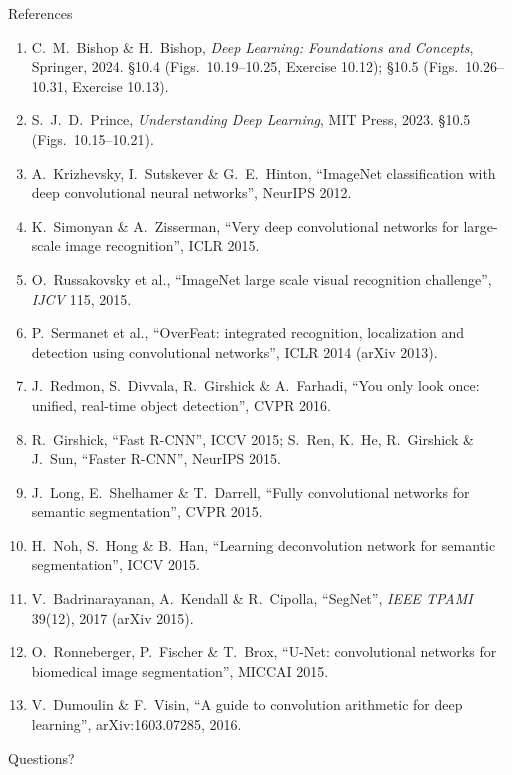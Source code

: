 \documentclass[aspectratio=169, 11pt]{beamer}
\begin{document}
\begin{frame}[allowframebreaks]{References}
  \vspace{0.3em}
  {\scriptsize
  \begin{enumerate}\itemsep0.30em
    \item C.\ M.\ Bishop \& H.\ Bishop, \emph{Deep Learning: Foundations
          and Concepts}, Springer, 2024. \S10.4 (Figs.~10.19--10.25,
          Exercise 10.12); \S10.5 (Figs.~10.26--10.31, Exercise 10.13).
    \item S.\ J.\ D.\ Prince, \emph{Understanding Deep Learning}, MIT
          Press, 2023. \S10.5 (Figs.~10.15--10.21).
    \item A.\ Krizhevsky, I.\ Sutskever \& G.\ E.\ Hinton, ``ImageNet
          classification with deep convolutional neural networks'',
          NeurIPS 2012.
    \item K.\ Simonyan \& A.\ Zisserman, ``Very deep convolutional
          networks for large-scale image recognition'', ICLR 2015.
    \item O.\ Russakovsky et al., ``ImageNet large scale visual
          recognition challenge'', \emph{IJCV} 115, 2015.
    \item P.\ Sermanet et al., ``OverFeat: integrated recognition,
          localization and detection using convolutional networks'',
          ICLR 2014 (arXiv 2013).
    \item J.\ Redmon, S.\ Divvala, R.\ Girshick \& A.\ Farhadi, ``You
          only look once: unified, real-time object detection'',
          CVPR 2016.
    \item R.\ Girshick, ``Fast R-CNN'', ICCV 2015; S.\ Ren, K.\ He,
          R.\ Girshick \& J.\ Sun, ``Faster R-CNN'', NeurIPS 2015.
    \item J.\ Long, E.\ Shelhamer \& T.\ Darrell, ``Fully convolutional
          networks for semantic segmentation'', CVPR 2015.
    \item H.\ Noh, S.\ Hong \& B.\ Han, ``Learning deconvolution network
          for semantic segmentation'', ICCV 2015.
    \item V.\ Badrinarayanan, A.\ Kendall \& R.\ Cipolla, ``SegNet'',
          \emph{IEEE TPAMI} 39(12), 2017 (arXiv 2015).
    \item O.\ Ronneberger, P.\ Fischer \& T.\ Brox, ``U-Net: convolutional
          networks for biomedical image segmentation'', MICCAI 2015.
    \item V.\ Dumoulin \& F.\ Visin, ``A guide to convolution arithmetic
          for deep learning'', arXiv:1603.07285, 2016.
  \end{enumerate}}
\end{frame}

\begin{frame}[standout]
  Questions?
\end{frame}
\end{document}
